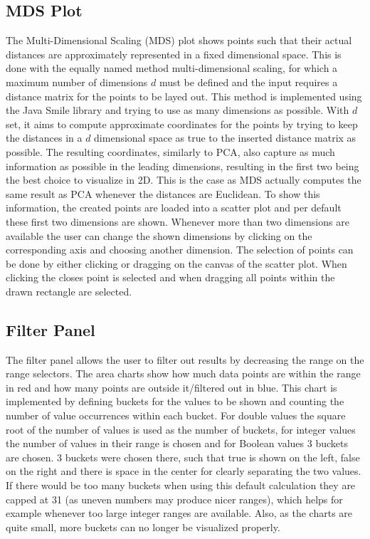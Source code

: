 \documentclass[
	a4paper,
	english,
	twoside,
	openright,               
	11pt                            
	]{report}
\begin{document}
\subsection{MDS Plot}
The Multi-Dimensional Scaling (MDS) plot shows points such that their actual distances are approximately represented in a fixed dimensional space. This is done with the equally named method multi-dimensional scaling, \cite{mds} for which a maximum number of dimensions $d$ must be defined and the input requires a distance matrix for the points to be layed out. This method is implemented using the Java Smile \cite{javasmile} library and trying to use as many dimensions as possible. With $d$ set, it aims to compute approximate coordinates for the points by trying to keep the distances in a $d$ dimensional space as true to the inserted distance matrix as possible. The resulting coordinates, similarly to PCA, also capture as much information as possible in the leading dimensions, resulting in the first two being the best choice to visualize in 2D. This is the case as MDS actually computes the same result as PCA whenever the distances are Euclidean. To show this information, the created points are loaded into a scatter plot and per default these first two dimensions are shown. Whenever more than two dimensions are available the user can change the shown dimensions by clicking on the corresponding axis and choosing another dimension. The selection of points can be done by either clicking or dragging on the canvas of the scatter plot. When clicking the closes point is selected and when dragging all points within the drawn rectangle are selected.

\subsection{Filter Panel}
The filter panel allows the user to filter out results by decreasing the range on the range selectors. The area charts show how much data points are within the range in red and how many points are outside it/filtered out in blue. This chart is implemented by defining buckets for the values to be shown and counting the number of value occurrences within each bucket. For double values the square root of the number of values is used as the number of buckets, for integer values the number of values in their range is chosen and for Boolean values 3 buckets are chosen. 3 buckets were chosen there, such that true is shown on the left, false on the right and there is space in the center for clearly separating the two values. If there would be too many buckets when using this default calculation they are capped at 31 (as uneven numbers may produce nicer ranges), which helps for example whenever too large integer ranges are available. Also, as the charts are quite small, more buckets can no longer be visualized properly.
\end{document}
